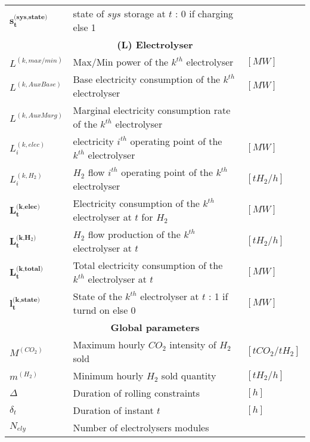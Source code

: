 \begin{table*}
\begin{tabular}{|p{3.5cm}p{6.5cm}p{5cm}|}
    $\textbf{s}_\textbf{t}^{\textbf{(sys,state)}}$      & state of $sys$ storage at $t$ : 0 if charging else 1   &  \\[0.3cm]
    \multicolumn{3}{|c|}{\textbf{(L) Electrolyser}} \\[0.3cm]
    $L^{(k,max/min)}$                   & Max/Min power of the $k^{th}$ electrolyser                                        & $[MW]$ \\
    $L^{(k,AuxBase)}$                   & Base electricity consumption of the $k^{th}$ electrolyser                         & $[MW]$ \\
    $L^{(k,AuxMarg)}$                   & Marginal electricity consumption rate of the $k^{th}$ electrolyser                &  \\
    $L_i^{(k,elec)}$                    & electricity $i^{th}$ operating point of the $k^{th}$ electrolyser                 & $[MW]$ \\
    $L_i^{(k,H_2)}$                     & $H_2$ flow $i^{th}$ operating point of the $k^{th}$ electrolyser                  & $[tH_2/h]$ \\[0.3cm]
    $\textbf{L}_\textbf{t}^{\textbf{(k,elec)}}$           & Electricity consumption of the $k^{th}$ electrolyser at $t$ for $H_2$             & $[MW]$ \\
    $\textbf{L}_\textbf{t}^{\textbf{(k,H$_2$)}}$            & $H_2$ flow production of the $k^{th}$ electrolyser at $t$                         & $[tH_2/h]$ \\
    $\textbf{L}_\textbf{t}^{\textbf{(k,total)}}$          & Total electricity consumption of the $k^{th}$ electrolyser at $t$                 & $[MW]$ \\
    $\textbf{l}_\textbf{t}^{\textbf{(k,state)}}$          & State of the $k^{th}$ electrolyser at $t$ : 1 if turnd on else 0                  & $[MW]$ \\[0.3cm]
    \multicolumn{3}{|c|}{\textbf{Global parameters}} \\[0.3cm]
    $M^{(CO_2)}$                    & Maximum hourly $CO_2$ intensity of $H_2$ sold                                         & $[tCO_2/tH_2]$ \\
    $m^{(H_2)}$                     & Minimum hourly $H_2$ sold quantity                                                    & $[tH_2/h]$ \\
    $\Delta$                        & Duration of rolling constraints                                                       & $[h]$ \\
    $\delta_t$                      & Duration of instant $t$                                                               & $[h]$ \\
    $N_{ely}$                       & Number of electrolysers modules                                                       & \\
    \hline     
    \end{tabular}
    \label{tab:system_parameters_and_DV}
\end{table*}